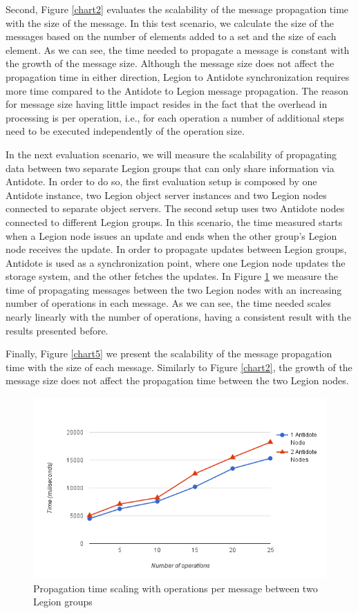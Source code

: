 Second, Figure \ref{chart2} evaluates the scalability of the message propagation time with the size of the message. In this test scenario, we calculate the size of the messages based on the number of elements added to a set and the size of each element. As we can see, the time needed to propagate a message is constant with the growth of the message size. Although the message size does not affect the propagation time in either direction, Legion to Antidote synchronization requires more time compared to the Antidote to Legion message propagation. The reason for message size having little impact resides in the fact that the overhead in processing is per operation, i.e., for each operation a number of additional steps need to be executed independently of the operation size.\par
	In the next evaluation scenario, we will measure the scalability of propagating data between two separate Legion groups that can only share information via Antidote. In order to do so, the first evaluation setup is composed by one Antidote instance, two Legion object server instances and two Legion nodes connected to separate object servers. The second setup uses two Antidote nodes connected to different Legion groups. In this scenario, the time measured starts when a Legion node issues an update and ends when the other group's Legion node receives the update. In order to propagate updates between Legion groups, Antidote is used as a synchronization point, where one Legion node updates the storage system, and the other fetches the updates. In Figure \ref{chart4} we measure the time of propagating messages between the two Legion nodes with an increasing number of operations in each message. As we can see, the time needed scales nearly linearly with the number of operations, having a consistent result with the results presented before.\par
	Finally, Figure \ref{chart5} we present the scalability of the message propagation time with the size of each message. Similarly to Figure \ref{chart2}, the growth of the message size does not affect the propagation time between the two Legion nodes.

\begin{figure}[h]
\centering
\includegraphics[scale=0.7]{files/chart4.png}
\caption{Propagation time scaling with operations per message between two Legion groups}
\label{chart4}
\end{figure}

